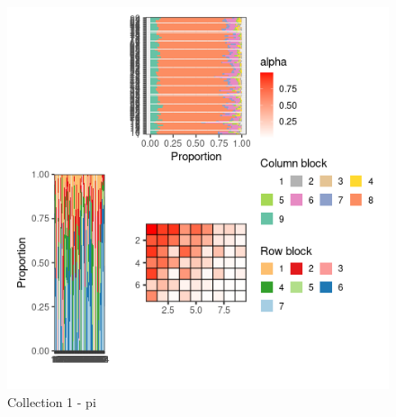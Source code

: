 \begin{figure}
\centering
\includegraphics{figure/pi_meso_plot-1.png}
\caption{Collection 1 - pi}
\end{figure}

